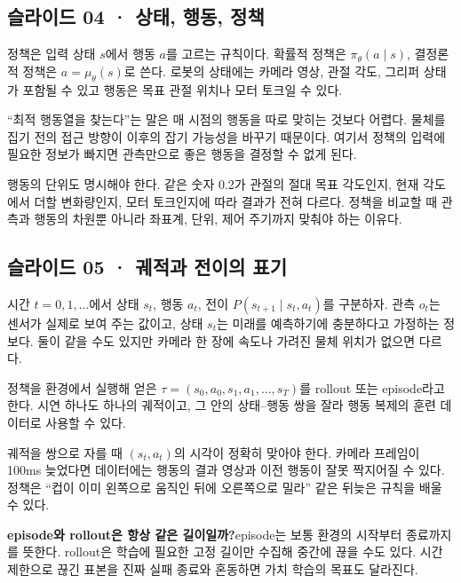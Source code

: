 \documentclass[11pt,a4paper]{article}
\begin{document}
\subsection{슬라이드 04 · 상태, 행동, 정책}

정책은 입력 상태 $s$에서 행동 $a$를 고르는 규칙이다. 확률적 정책은 $\pi_\theta(a\mid s)$, 결정론적 정책은 $a=\mu_\theta(s)$로 쓴다. 로봇의 상태에는 카메라 영상, 관절 각도, 그리퍼 상태가 포함될 수 있고 행동은 목표 관절 위치나 모터 토크일 수 있다.\par

“최적 행동열을 찾는다”는 말은 매 시점의 행동을 따로 맞히는 것보다 어렵다. 물체를 집기 전의 접근 방향이 이후의 잡기 가능성을 바꾸기 때문이다. 여기서 정책의 입력에 필요한 정보가 빠지면 관측만으로 좋은 행동을 결정할 수 없게 된다.\par

행동의 단위도 명시해야 한다. 같은 숫자 0.2가 관절의 절대 목표 각도인지, 현재 각도에서 더할 변화량인지, 모터 토크인지에 따라 결과가 전혀 다르다. 정책을 비교할 때 관측과 행동의 차원뿐 아니라 좌표계, 단위, 제어 주기까지 맞춰야 하는 이유다.\par

\subsection{슬라이드 05 · 궤적과 전이의 표기}

시간 $t=0,1,\ldots$에서 상태 $s_t$, 행동 $a_t$, 전이 $P(s_{t+1}\mid s_t,a_t)$를 구분하자. 관측 $o_t$는 센서가 실제로 보여 주는 값이고, 상태 $s_t$는 미래를 예측하기에 충분하다고 가정하는 정보다. 둘이 같을 수도 있지만 카메라 한 장에 속도나 가려진 물체 위치가 없으면 다르다.\par

정책을 환경에서 실행해 얻은 $\tau=(s_0,a_0,s_1,a_1,\ldots,s_T)$를 rollout 또는 episode라고 한다. 시연 하나도 하나의 궤적이고, 그 안의 상태–행동 쌍을 잘라 행동 복제의 훈련 데이터로 사용할 수 있다.\par

궤적을 쌍으로 자를 때 $(s_t,a_t)$의 시각이 정확히 맞아야 한다. 카메라 프레임이 100ms 늦었다면 데이터에는 행동의 결과 영상과 이전 행동이 잘못 짝지어질 수 있다. 정책은 “컵이 이미 왼쪽으로 움직인 뒤에 오른쪽으로 밀라” 같은 뒤늦은 규칙을 배울 수 있다.\par

\par\medskip\noindent\textbf{episode와 rollout은 항상 같은 길이일까?}\quad episode는 보통 환경의 시작부터 종료까지를 뜻한다. rollout은 학습에 필요한 고정 길이만 수집해 중간에 끊을 수도 있다. 시간 제한으로 끊긴 표본을 진짜 실패 종료와 혼동하면 가치 학습의 목표도 달라진다.\par
\end{document}

